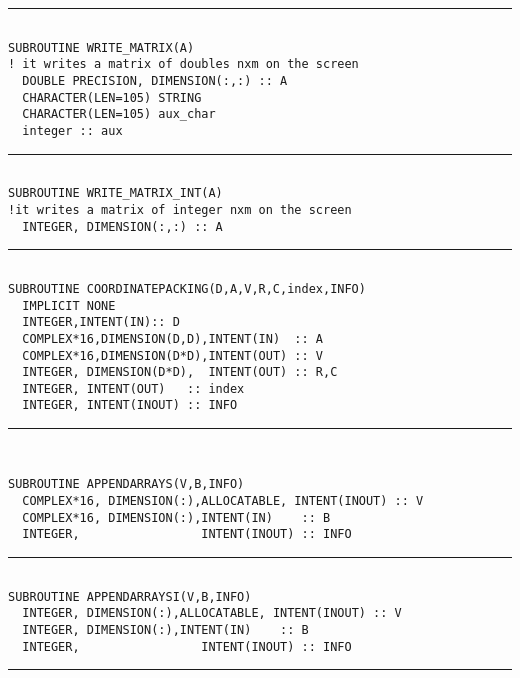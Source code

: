 \documentclass[10pt,a4paper]{article}
\begin{document}
\begin{center}
\rule{12cm}{1pt}
\end{center}
\begin{verbatim}

SUBROUTINE WRITE_MATRIX(A)
! it writes a matrix of doubles nxm on the screen
  DOUBLE PRECISION, DIMENSION(:,:) :: A
  CHARACTER(LEN=105) STRING
  CHARACTER(LEN=105) aux_char
  integer :: aux

\end{verbatim}
\begin{center}
\rule{12cm}{1pt}
\end{center}
\begin{verbatim}

SUBROUTINE WRITE_MATRIX_INT(A)
!it writes a matrix of integer nxm on the screen
  INTEGER, DIMENSION(:,:) :: A

\end{verbatim}
\begin{center}
\rule{12cm}{1pt}
\end{center}
\begin{verbatim}

SUBROUTINE COORDINATEPACKING(D,A,V,R,C,index,INFO)
  IMPLICIT NONE
  INTEGER,INTENT(IN):: D
  COMPLEX*16,DIMENSION(D,D),INTENT(IN)  :: A
  COMPLEX*16,DIMENSION(D*D),INTENT(OUT) :: V
  INTEGER, DIMENSION(D*D),  INTENT(OUT) :: R,C
  INTEGER, INTENT(OUT)   :: index
  INTEGER, INTENT(INOUT) :: INFO
\end{verbatim}
\begin{center}
\rule{12cm}{1pt}
\end{center}
\begin{verbatim}


SUBROUTINE APPENDARRAYS(V,B,INFO)
  COMPLEX*16, DIMENSION(:),ALLOCATABLE, INTENT(INOUT) :: V
  COMPLEX*16, DIMENSION(:),INTENT(IN)    :: B
  INTEGER,                 INTENT(INOUT) :: INFO

\end{verbatim}
\begin{center}
\rule{12cm}{1pt}
\end{center}
\begin{verbatim}

SUBROUTINE APPENDARRAYSI(V,B,INFO)
  INTEGER, DIMENSION(:),ALLOCATABLE, INTENT(INOUT) :: V
  INTEGER, DIMENSION(:),INTENT(IN)    :: B
  INTEGER,                 INTENT(INOUT) :: INFO

\end{verbatim}
\begin{center}
\rule{12cm}{1pt}
\end{center}
\end{document}
